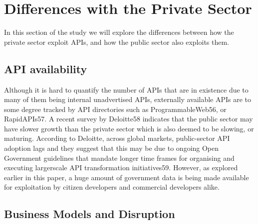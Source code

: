 \chapter{Differences with the Private Sector}

\ifpdf
    \graphicspath{{Chapter3/Figs/Raster/}{Chapter3/Figs/PDF/}{Chapter3/Figs/}}
\else
    \graphicspath{{Chapter3/Figs/Vector/}{Chapter3/Figs/}}
\fi

In this section of the study we will explore the differences between how the private sector exploit APIs, and
how the public sector also exploits them.

\section{API availability}

Although it is hard to quantify the number of APIs that are in existence due to many of them being internal
unadvertised APIs, externally available APIs are to some degree tracked by API directories such as
ProgrammableWeb56, or RapidAPIs57. A recent survey by Deloitte58 indicates that the public sector may
have slower growth than the private sector which is also deemed to be slowing, or maturing. According to
Deloitte, across global markets, public-sector API adoption lags and they suggest that this may be due to
ongoing Open Government guidelines that mandate longer time frames for organising and executing largerscale API transformation initiatives59. However, as explored earlier in this paper, a huge amount of
government data is being made available for exploitation by citizen developers and commercial developers
alike.

\section{Business Models and Disruption}


